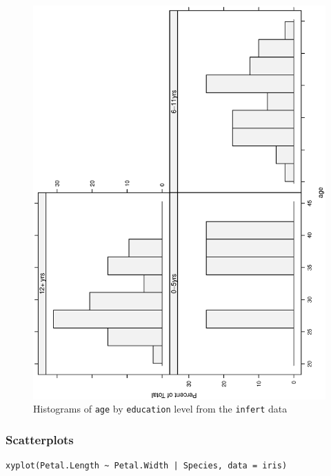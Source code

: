 \documentclass[captions=tableheading]{scrbook}
\begin{document}
\begin{figure}[th]
  \includegraphics[angle=270, totalheight=4in]{ps/datadesc/histograms-lattice.ps}
  \caption[Histograms of \texttt{age} by \texttt{education} level]{Histograms of \texttt{age} by \texttt{education} level from the \texttt{infert} data}
  \label{fig-histograms-lattice}
\end{figure}
\subsubsection{Scatterplots}
\label{sec-3-6-3-3}



\begin{verbatim}
xyplot(Petal.Length ~ Petal.Width | Species, data = iris)
\end{verbatim}
\end{document}
